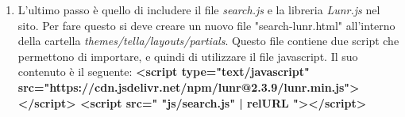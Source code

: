 \documentclass[target=bach,aauheader=]{thud}
\begin{document}
\begin{enumerate}
    \item L'ultimo passo è quello di includere il file \textit{search.js} e la libreria \textit{Lunr.js} nel sito. Per fare questo si deve creare un nuovo file "search-lunr.html" all'interno della cartella \textit{themes/tella/layouts/partials}. 
    Questo file contiene due script che permettono di importare, e quindi di utilizzare il file javascript. Il suo contenuto è il seguente:
    \newline \newline
    \textbf{
        \textless script type="text/javascript" src="https://cdn.jsdelivr.net/npm/lunr@2.3.9/lunr.min.js"\textgreater} \textbf{\textless /script\textgreater
        \newline
        \textless script src="{{ "js/search.js" | relURL }}"\textgreater \textless /script\textgreater
    }
\end{enumerate}
\end{document}

